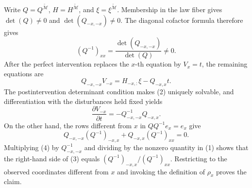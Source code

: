 Write \(Q=Q^{\widetilde{\mathcal M}}\), \(H=H^{\widetilde{\mathcal M}}\), and \(\xi=\xi^{\widetilde{\mathcal M}}\). Membership in the law fiber gives \(\det(Q)\ne0\) and \(\det(Q_{-x,-x})\ne0\). The diagonal cofactor formula therefore gives
\[
 (Q^{-1})_{xx}=\frac{\det(Q_{-x,-x})}{\det(Q)}\ne0. \tag{1}
\]
After the perfect intervention replaces the \(x\)-th equation by \(V_x=t\), the remaining equations are
\[
 Q_{-x,-x}V_{-x}=H_{-x,:}\xi-Q_{-x,x}t. \tag{2}
\]
The postintervention determinant condition makes (2) uniquely solvable, and differentiation with the disturbances held fixed yields
\[
 \frac{\partial V_{-x}}{\partial t}=-Q_{-x,-x}^{-1}Q_{-x,x}. \tag{3}
\]
On the other hand, the rows different from \(x\) in \(QQ^{-1}e_x=e_x\) give
\[
 Q_{-x,-x}(Q^{-1})_{-x,x}+Q_{-x,x}(Q^{-1})_{xx}=0. \tag{4}
\]
Multiplying (4) by \(Q_{-x,-x}^{-1}\) and dividing by the nonzero quantity in (1) shows that the right-hand side of (3) equals \((Q^{-1})_{-x,x}/(Q^{-1})_{xx}\). Restricting to the observed coordinates different from \(x\) and invoking the definition of \(\rho_x\) proves the claim.
